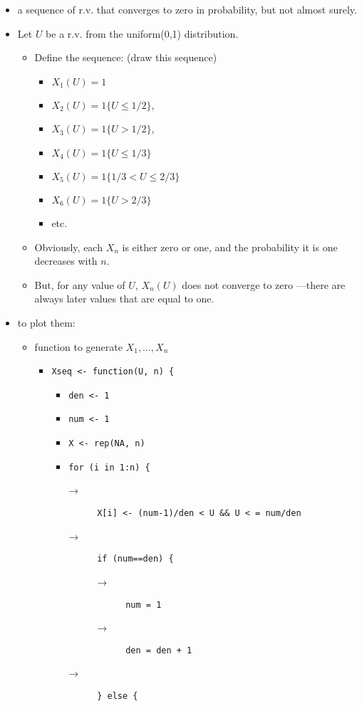 \begin{itemize}
\item a sequence of r.v. that converges to zero in probability, but
        not almost surely.
\item Let $U$ be a r.v. from the uniform(0,1) distribution.
\begin{itemize}
\item Define the sequence: (draw this sequence)
\begin{itemize}
\item $X_1(U) = 1$
\item $X_2(U) = 1\{U \leq 1/2\}$,
\item $X_3(U) = 1\{U > 1/2\}$,
\item $X_4(U) = 1\{U \leq 1/3\}$
\item $X_5(U) = 1\{1/3 < U \leq 2/3\}$
\item $X_6(U) = 1\{U > 2/3\}$
\item etc.
\end{itemize}
\item Obviously, each $X_n$ is either zero or one, and the
          probability it is one decreases with $n$.
\item But, for any value of $U$, $X_n(U)$ does not converge to zero
          ---there are always later values that are equal to one.
\end{itemize}
\item to plot them:
\begin{itemize}
\item function to generate $X_1,\dots,X_n$
\begin{itemize}
\item \texttt{Xseq <- function(U, n) \{}
\begin{itemize}
\item \texttt{den <- 1}
\item \texttt{num <- 1}
\item \texttt{X <- rep(NA, n)}
\item \texttt{for (i in 1:n) \{}
  \begin{description}
  \item[→] \texttt{X[i] <- (num-1)/den < U \&\& U < = num/den}
  \item[→] \texttt{if (num==den) \{}
    \begin{description}
    \item[→] \texttt{num = 1}
    \item[→] \texttt{den = den + 1}
    \end{description}
  \item[→] \texttt{\} else \{}

\end{description}
\end{itemize}
\end{itemize}
\end{itemize}
\end{itemize}
